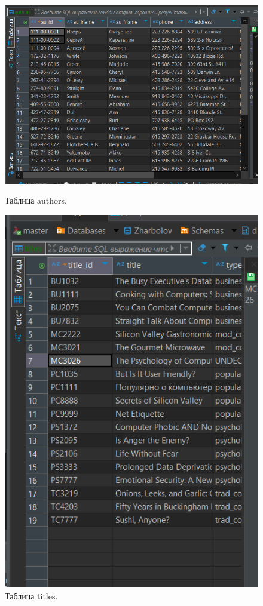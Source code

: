 \begin{figure}[h!]
    \begin{minipage}[p]{0.45\linewidth}
        \centering
        \includegraphics[width=0.8\linewidth]{Pic/lab3/DataAuthors.PNG}
        \caption{Таблица authors.}
    \end{minipage}
    \hfill
    \begin{minipage}[p]{0.45\linewidth}
        \centering
        \includegraphics[width=0.8\linewidth]{Pic/lab3/DataTitle.PNG}
        \caption{Таблица titles.}
    \end{minipage}
    
\end{figure}
